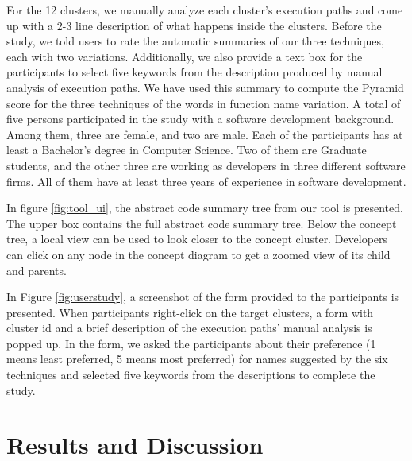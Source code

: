 For the 12 clusters, we manually analyze each cluster's execution paths and come up with a 2-3 line description of what happens inside the clusters. Before the study, we told users to rate the automatic summaries of our three techniques, each with two variations. Additionally, we also provide a text box for the participants to select five keywords from the description produced by manual analysis of execution paths. We have used this summary to compute the Pyramid score for the three techniques of the words in function name variation. A total of five persons participated in the study with a software development background. Among them, three are female, and two are male. Each of the participants has at least a Bachelor's degree in Computer Science. Two of them are Graduate students, and the other three are working as developers in three different software firms. All of them have at least three years of experience in software development.

In figure \ref{fig:tool_ui}, the abstract code summary tree from our tool is presented. The upper box contains the full abstract code summary tree. Below the concept tree, a local view can be used to look closer to the concept cluster. Developers can click on any node in the concept diagram to get a zoomed view of its child and parents. 

In Figure \ref{fig:userstudy}, a screenshot of the form provided to the participants is presented. When participants right-click on the target clusters, a form with cluster id and a brief description of the execution paths' manual analysis is popped up. In the form, we asked the participants about their preference (1 means least preferred, 5 means most preferred) for names suggested by the six techniques and selected five keywords from the descriptions to complete the study.

\section{Results and Discussion}
\label{results}
